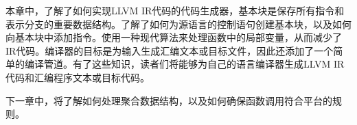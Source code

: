 本章中，了解了如何实现LLVM IR代码的代码生成器，基本块是保存所有指令和表示分支的重要数据结构。了解了如何为源语言的控制语句创建基本块，以及如何向基本块中添加指令。使用一种现代算法来处理函数中的局部变量，从而减少了IR代码。编译器的目标是为输入生成汇编文本或目标文件，因此还添加了一个简单的编译管道。有了这些知识，读者们将能够为自己的语言编译器生成LLVM IR代码和汇编程序文本或目标代码。

下一章中，将了解如何处理聚合数据结构，以及如何确保函数调用符合平台的规则。